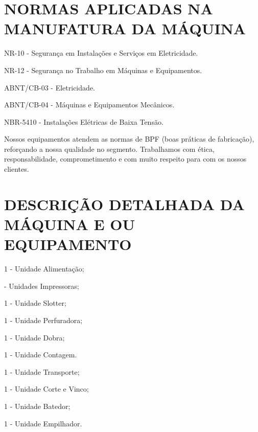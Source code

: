 \thispagestyle{fancy}

\vspace*{\fill}

\section{\large{NORMAS APLICADAS NA MANUFATURA DA MÁQUINA}}
\label{sec:normas}


\begin{standartsMet}
    \item NR-10 - Segurança em Instalações e Serviços em Eletricidade.
    \item NR-12 - Segurança no Trabalho em Máquinas e Equipamentos.
    \item ABNT/CB-03 - Eletricidade.
    \item ABNT/CB-04 - Máquinas e Equipamentos Mecânicos.
    \item NBR-5410 - Instalações Elétricas de Baixa Tensão.
\end{standartsMet}

Nossos equipamentos atendem as normas de BPF (boas práticas de fabricação), reforçando a nossa qualidade no segmento.
Trabalhamos com ética, responsabilidade, comprometimento e com muito respeito para com os nossos clientes.

\vspace{40 pt}

\section{\large{\MakeUppercase{Descrição Detalhada da Máquina e ou Equipamento}}}
\label{sec:machineDescription}


\begin{machinePartsList}
    \item 1 - Unidade Alimentação;
    \item \numberOfPrinters \space - Unidades Impressoras;
    \ifmachineType
        \item 1 - Unidade Slotter;
        \ifunidadePerfuradora
        \item 1 - Unidade Perfuradora;
        \fi
        \item 1 - Unidade Dobra;
        \item 1 - Unidade Contagem.
    \else
        \item 1 - Unidade Transporte;
        \item 1 - Unidade Corte e Vinco;
        \item 1 - Unidade Batedor;
        \item 1 - Unidade Empilhador.
    \fi
\end{machinePartsList}

